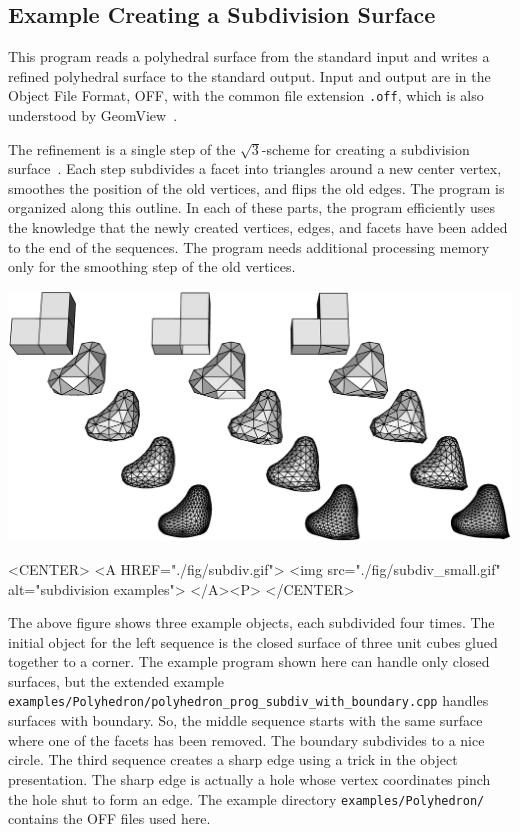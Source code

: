 \subsection{Example Creating a Subdivision Surface}

This program reads a polyhedral surface from the standard input and
writes a refined polyhedral surface to the standard output. Input and
output are in the Object File Format, OFF, with the common file
extension {\tt .off}, which is also understood by
GeomView~\cite{cgal:p-gmgv16-96}.

The refinement is a single step of the $\sqrt{3}$-scheme for creating
a subdivision surface~\cite{cgal:k-s-00}. Each step subdivides a facet
into triangles around a new center vertex, smoothes the position of the
old vertices, and flips the old edges. The program is organized along
this outline. In each of these parts, the program efficiently uses the
knowledge that the newly created vertices, edges, and facets have been
added to the end of the sequences. The program needs additional
processing memory only for the smoothing step of the old vertices.

\begin{ccTexOnly}
    \begin{center}
      \parbox{\textwidth}{%
          \includegraphics[width=\textwidth]{Polyhedron/fig/subdiv}%
      }
    \end{center}
\end{ccTexOnly}

\begin{ccHtmlOnly}
    <CENTER>
        <A HREF="./fig/subdiv.gif">
            <img src="./fig/subdiv_small.gif" alt="subdivision examples">
        </A><P>
    </CENTER>
\end{ccHtmlOnly}

The above figure shows three example objects, each 
subdivided four times. The initial object for the left sequence is
the closed surface of three unit cubes glued together to a corner.
The example program shown here can handle only closed surfaces, 
but the extended example
\texttt{examples/Polyhedron/polyhedron\_prog\_subdiv\_with\_boundary.cpp}
handles surfaces with boundary. So, the middle sequence starts with
the same surface where one of the facets has been removed. The boundary
subdivides to a nice circle. The third sequence creates a sharp
edge using a trick in the object presentation. The sharp edge is 
actually a hole whose vertex coordinates pinch the hole shut to form an
edge. The example directory \texttt{examples/Polyhedron/} contains the 
OFF files used here.

